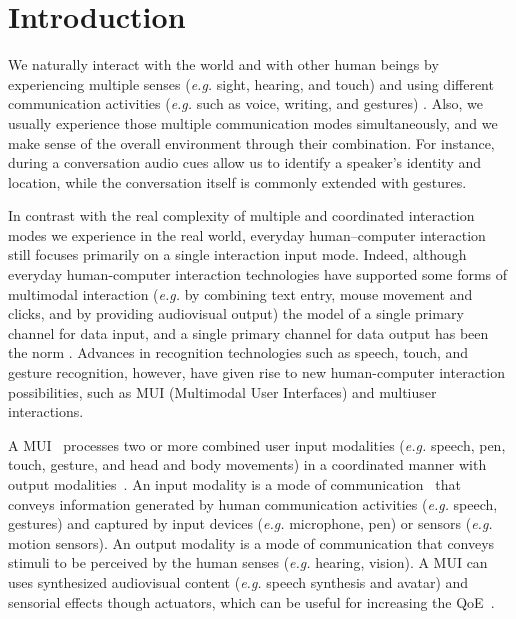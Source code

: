 \chapter{Introduction}
\label{chp:intro}

We naturally interact with the world and with other human beings by experiencing
multiple senses (\textit{e.g.} sight, hearing, and touch) and using different
communication activities (\textit{e.g.} such as voice, writing, and gestures)
\cite{jaimes_multimodal_2007}. Also, we usually experience those multiple
communication modes simultaneously, and we make sense of the overall environment
through their combination. For instance, during a conversation audio cues allow
us to identify a speaker’s identity and location, while the conversation itself
is commonly extended with gestures.

In contrast with the real complexity of multiple and coordinated interaction
modes we experience in the real world, everyday human–computer interaction still
focuses primarily on a single interaction input mode. Indeed, although everyday
human-computer interaction technologies have supported some forms of multimodal
interaction (\textit{e.g.} by combining text entry, mouse movement and clicks, and by
providing audiovisual output) the model of a single primary channel for data
input, and a single primary channel for data output has been the norm
\cite{turk_multimodal_2014}. Advances in recognition technologies such as
speech, touch, and gesture recognition, however, have given rise to new
human-computer interaction possibilities, such as MUI (Multimodal User
Interfaces) and multiuser interactions.

A MUI~\cite{turk_multimodal_2014} processes two or more combined user input
modalities (\textit{e.g.} speech, pen, touch, gesture, and head and body movements) in a
coordinated manner with output modalities~\cite{oviatt_multimodal_2007}. An
input modality is a mode of
communication~\cite{jaimes_multimodal_2007} that conveys information generated
by human communication activities (\textit{e.g.} speech, gestures) and captured by input
devices (\textit{e.g.} microphone, pen) or sensors (\textit{e.g.} motion sensors). An output
modality is a mode of communication that conveys stimuli to be perceived by the
human senses (\textit{e.g.} hearing, vision). A MUI can uses synthesized audiovisual
content (\textit{e.g.} speech synthesis and avatar) and sensorial effects though
actuators, which can be useful for increasing the
QoE~\cite{ghinea_mulsemedia:_2014}.

